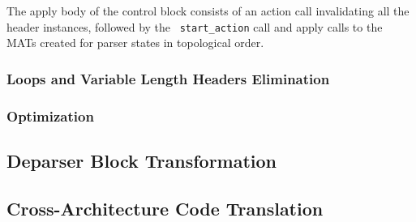 The apply body of the control block consists of an action call invalidating all the header instances, followed by the ~\texttt{start\_action} call and apply calls to the MATs created for parser states in topological order.



\subsubsection{Loops and Variable Length Headers Elimination}
\label{loops-and-variable-length-headers-elimination}

\subsubsection{Optimization}



\subsection{Deparser Block Transformation}

\subsection{Cross-Architecture Code Translation}
